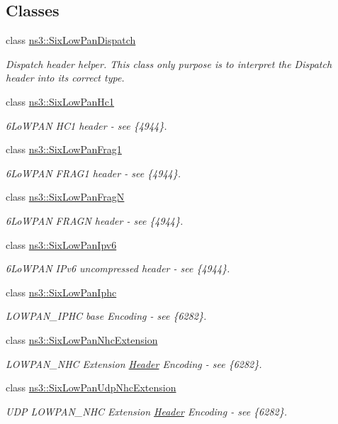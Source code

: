 \subsection*{Classes}
\begin{DoxyCompactItemize}
\item 
class \hyperlink{classns3_1_1SixLowPanDispatch}{ns3\+::\+Six\+Low\+Pan\+Dispatch}
\begin{DoxyCompactList}\small\item\em Dispatch header helper. This class only purpose is to interpret the Dispatch header into its correct type. \end{DoxyCompactList}\item 
class \hyperlink{classns3_1_1SixLowPanHc1}{ns3\+::\+Six\+Low\+Pan\+Hc1}
\begin{DoxyCompactList}\small\item\em 6\+Lo\+W\+P\+AN H\+C1 header -\/ see \{4944\}. \end{DoxyCompactList}\item 
class \hyperlink{classns3_1_1SixLowPanFrag1}{ns3\+::\+Six\+Low\+Pan\+Frag1}
\begin{DoxyCompactList}\small\item\em 6\+Lo\+W\+P\+AN F\+R\+A\+G1 header -\/ see \{4944\}. \end{DoxyCompactList}\item 
class \hyperlink{classns3_1_1SixLowPanFragN}{ns3\+::\+Six\+Low\+Pan\+FragN}
\begin{DoxyCompactList}\small\item\em 6\+Lo\+W\+P\+AN F\+R\+A\+GN header -\/ see \{4944\}. \end{DoxyCompactList}\item 
class \hyperlink{classns3_1_1SixLowPanIpv6}{ns3\+::\+Six\+Low\+Pan\+Ipv6}
\begin{DoxyCompactList}\small\item\em 6\+Lo\+W\+P\+AN I\+Pv6 uncompressed header -\/ see \{4944\}. \end{DoxyCompactList}\item 
class \hyperlink{classns3_1_1SixLowPanIphc}{ns3\+::\+Six\+Low\+Pan\+Iphc}
\begin{DoxyCompactList}\small\item\em L\+O\+W\+P\+A\+N\+\_\+\+I\+P\+HC base Encoding -\/ see \{6282\}. \end{DoxyCompactList}\item 
class \hyperlink{classns3_1_1SixLowPanNhcExtension}{ns3\+::\+Six\+Low\+Pan\+Nhc\+Extension}
\begin{DoxyCompactList}\small\item\em L\+O\+W\+P\+A\+N\+\_\+\+N\+HC Extension \hyperlink{classns3_1_1Header}{Header} Encoding -\/ see \{6282\}. \end{DoxyCompactList}\item 
class \hyperlink{classns3_1_1SixLowPanUdpNhcExtension}{ns3\+::\+Six\+Low\+Pan\+Udp\+Nhc\+Extension}
\begin{DoxyCompactList}\small\item\em U\+DP L\+O\+W\+P\+A\+N\+\_\+\+N\+HC Extension \hyperlink{classns3_1_1Header}{Header} Encoding -\/ see \{6282\}. \end{DoxyCompactList}\end{DoxyCompactItemize}
